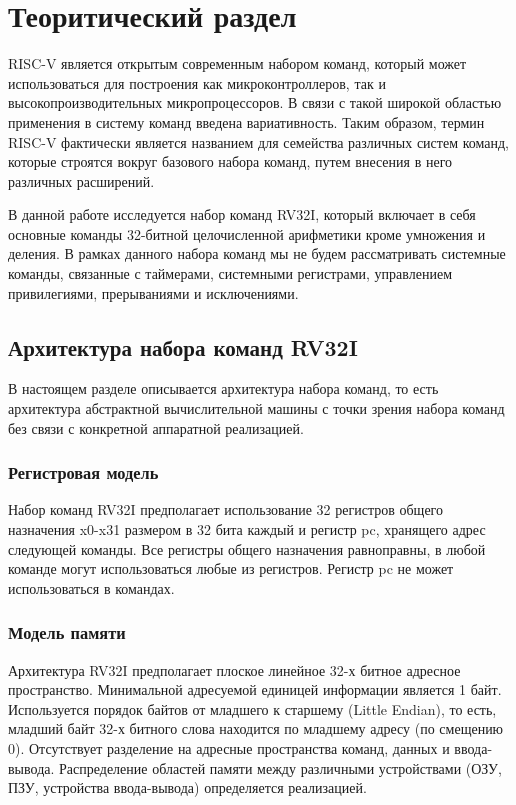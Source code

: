 \chapter{Теоритический раздел}

RISC-V является открытым современным набором команд, который может использоваться для построения как микроконтроллеров, так и высокопроизводительных микропроцессоров. В связи с такой широкой областью применения в систему команд введена вариативность. Таким образом, термин RISC-V фактически является названием для семейства различных систем команд, которые строятся вокруг базового набора команд, путем внесения в него различных расширений.

В данной работе исследуется набор команд RV32I, который включает в себя основные команды 32-битной целочисленной арифметики кроме умножения и деления. В рамках данного набора команд мы не будем рассматривать системные команды, связанные с таймерами, системными регистрами, управлением привилегиями, прерываниями и исключениями.

\section{Архитектура набора команд RV32I}

В настоящем разделе описывается архитектура набора команд, то есть архитектура абстрактной вычислительной машины с точки зрения набора команд без связи с конкретной аппаратной реализацией.

\subsection{Регистровая модель}

Набор команд RV32I предполагает использование 32 регистров общего назначения x0-x31 размером в 32 бита каждый и регистр pc, хранящего адрес следующей команды. Все регистры общего назначения равноправны, в любой команде могут использоваться любые из регистров. Регистр pc не может использоваться в командах.

\subsection{Модель памяти}

Архитектура RV32I предполагает плоское линейное 32-х битное адресное пространство. Минимальной адресуемой единицей информации является 1 байт. Используется порядок байтов от младшего к старшему (Little Endian), то есть, младший байт 32-х битного слова находится по младшему адресу (по смещению 0). Отсутствует разделение на адресные пространства команд, данных и ввода-вывода. Распределение областей памяти между различными устройствами (ОЗУ, ПЗУ, устройства ввода-вывода) определяется реализацией.

